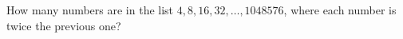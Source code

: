 How many numbers are in the list $4,8,16,32,\dots,1048576$, where each number is twice the previous one?
